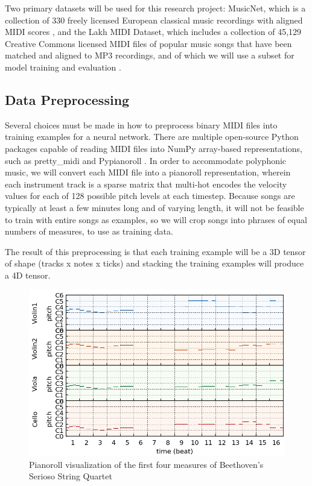 \documentclass[sigconf,authorversion]{acmart}
\begin{document}
Two primary datasets will be used for this research project: MusicNet,
which is a collection of 330 freely licensed European classical music
recordings with aligned MIDI scores \cite{thickstun2017learning}, and
the Lakh MIDI Dataset, which includes a collection of 45,129 Creative
Commons licensed MIDI files of popular music songs that have been
matched and aligned to MP3 recordings, and of which we will use a
subset for model training and evaluation
\cite{raffel_learning-based_2016}.

\subsection{Data Preprocessing}

Several choices must be made in how to preprocess binary MIDI files
into training examples for a neural network. There are multiple
open-source Python packages capable of reading MIDI files into NumPy
array-based representations, such as pretty\_midi
\cite{raffel_pretty_midi_2014} and Pypianoroll
\cite{dong_pypianoroll_2018}. In order to accommodate polyphonic
music, we will convert each MIDI file into a pianoroll representation,
wherein each instrument track is a sparse matrix that multi-hot
encodes the velocity values for each of 128 possible pitch levels at
each timestep. Because songs are typically at least a few minutes long
and of varying length, it will not be feasible to train with entire
songs as examples, so we will crop songs into phrases of equal numbers
of measures, to use as training data.

The result of this preprocessing is that each training example will be
a 3D tensor of shape (tracks x notes x ticks) and stacking the
training examples will produce a 4D tensor.

\begin{figure}[h]
  \centering
  \includegraphics[width=\linewidth]{first_four_bars.png}
  \caption{Pianoroll visualization of the first four measures of
    Beethoven's Serioso String Quartet}
\end{figure}
\end{document}
